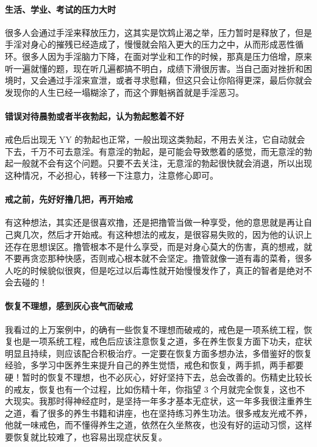\paragraph{生活、学业、考试的压力大时} 很多人会通过手淫来释放压力，这其实是饮鸩止渴之举，压力暂时是释放了，但是手淫对身心的摧残已经造成了，慢慢就会陷入更大的压力之中，从而形成恶性循环。很多人因为手淫脑力下降，在面对学业和工作的时候，那真是压力倍增，原来听一遍就懂的题，现在听几遍都搞不明白，成绩下滑很厉害。当自己面对挫折和困境时，又会通过手淫来宣泄，或者寻求慰藉，但这只会让你陷得更深，最后你就会发现你的人生已经一塌糊涂了，而这个罪魁祸首就是手淫恶习。

\paragraph{错误对待晨勃或者半夜勃起，认为勃起憋着不好} 戒色后出现无 YY 的勃起也正常，一般出现这类勃起，不用去关注，它自动就会下去，千万不可去意淫。有意淫的勃起，是可能会导致憋着的感觉，而无意淫的勃起一般就不会有这个问题。只要不去关注，无意淫的勃起很快就会消退，所以出现这种情况，不必担心，转移一下注意力，注意修心即可。

\paragraph{戒之前，先好好撸几把，再开始戒} 有这种想法，其实还是很喜欢撸，还是把撸管当做一种享受，他的意思就是再让自己爽几次，然后才开始戒。有这种想法的戒友，是很容易失败的，因为他的认识上还存在思想误区。撸管根本不是什么享受，而是对身心莫大的伤害，真的想戒，就不要再贪恋那种快感，否则戒心根本就不会坚定。撸管就像一道有毒的菜肴，很多人吃的时候貌似很爽，但是吃过以后毒性就开始慢慢发作了，真正的智者是绝对不会去碰的！

\paragraph{恢复不理想，感到灰心丧气而破戒} 我看过的上万案例中，的确有一些恢复不理想而破戒的，戒色是一项系统工程，恢复也是一项系统工程，戒色后应该注意恢复之道，多在养生恢复方面下功夫，症状明显且持续，则应该配合积极治疗。一定要在恢复方面多想办法，多借鉴好的恢复经验，多学习中医养生来提升自己的养生觉悟，戒色和恢复，两手抓，两手都要硬！暂时的恢复不理想，也不必灰心，好好坚持下去，总会改善的。伤精史比较长的戒友，恢复也有一个过程，比如伤精十年，你指望 3 个月就完全恢复，这也不大现实。我那时得神经症时，是坚持一年多才基本无症状，这一年多我很注重养生之道，看了很多的养生书籍和讲座，也在坚持练习养生功法。很多戒友光戒不养，他就一味戒色，而不懂得养生之道，依然在久坐熬夜，也没有好的运动习惯，这样要恢复就比较难了，也容易出现症状反复。


